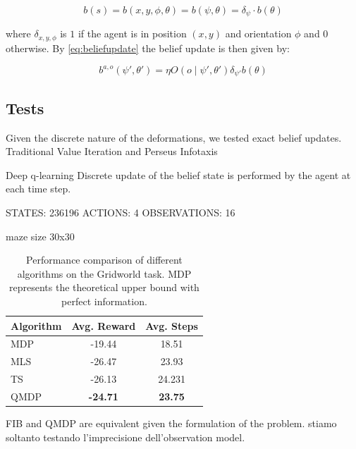 $$b(s) = b(x,y,\phi,\theta) = b(\psi, \theta) = \delta_{\psi} \cdot b(\theta)$$

where $\delta_{x,y,\phi}$ is $1$ if the agent is in position $(x,y)$ and orientation $\phi$ and $0$ otherwise.
By \cref{eq:beliefupdate} the belief update is then given by:

\begin{equation}
    \label{eq:beliefupdategridworld}
    b^{a,o}(\psi',\theta') = \eta O(o\mid \psi',\theta') \delta_{\psi'}b(\theta) 
\end{equation}



\subsection{Tests}

Given the discrete nature of the deformations, we tested exact belief updates.
Traditional Value Iteration and Perseus Infotaxis

Deep q-learning 
Discrete update of the belief state is performed by the agent at each time step.


STATES: 236196
ACTIONS: 4
OBSERVATIONS: 16

maze size 30x30

\begin{table}[h]
\centering
\begin{tabular}{lcc}
\toprule
\textbf{Algorithm} & \textbf{Avg. Reward} & \textbf{Avg. Steps} \\
\midrule
MDP & -19.44 & 18.51\\
\midrule
MLS & -26.47 & 23.93\\
TS &-26.13 & 24.231\\
QMDP & \textbf{-24.71} & \textbf{23.75} \\
\bottomrule
\end{tabular}
\caption{Performance comparison of different algorithms on the Gridworld task. MDP represents the theoretical upper bound with perfect information.}
\label{tab:gridworld_results}
\end{table}


FIB and QMDP are equivalent given the formulation of the problem. stiamo soltanto 
testando l'imprecisione dell'observation model.


